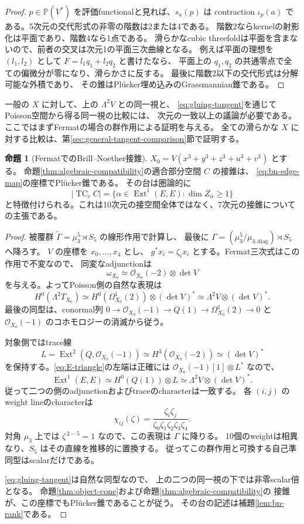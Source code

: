 \documentclass[a4paper,11pt]{ltjsarticle}
\theoremstyle{definition}
\newtheorem{theorem}{命題}[section]
\newcommand{\OO}{\mathcal O}
\newcommand{\PP}{\mathbb P}
\newcommand{\Ext}{\operatorname{Ext}}
\begin{document}
\begin{proof}
$p\in\PP(V^*)$ を評価functionalと見れば、$s_a(p)$ は contraction
$\iota_p(a)$ である。5次元の交代形式の非零の階数は2または4である。
階数2ならkernelの射影化は平面であり、階数4なら1点である。
滑らかなcubic threefoldは平面を含まないので、前者の交叉は次元1の平面三次曲線となる。
例えば平面の理想を $(l_1,l_2)$ として $F=l_1q_1+l_2q_2$ と書けたなら、
平面上の $q_1,q_2$ の共通零点で全ての偏微分が零になり、滑らかさに反する。
最後に階数2以下の交代形式は分解可能な外積であり、
その錐はPl\"ucker埋め込みのGrassmannian錐である。
\end{proof}

一般の $X$ に対して、上の $\Lambda^2V$ との同一視と、
\eqref{eq:gluing-tangent}を通じてPoisson空間から得る同一視の比較には、
次元の一致以上の議論が必要である。
ここではまずFermatの場合の群作用による証明を与える。
全ての滑らかな $X$ に対する比較は、第\ref{sec:general-tangent-comparison}節で証明する。

\begin{theorem}[FermatでのBrill--Noether接錐]\label{thm:fermat-bn-cone}
$X_0=V(x^3+y^3+z^3+u^3+v^3)$ とする。
命題\ref{thm:algebraic-compatibility}の適合部分空間 $C$ の接錐は、
\eqref{eq:bn-edge-map}の座標でPl\"ucker錐である。
その台は圏論的に
\[
 \left|\operatorname{TC}_cC\right|
 =\{\alpha\in\Ext^1(E,E):\dim Z_\alpha\ge1\}
\]
と特徴付けられる。これは10次元の接空間全体ではなく、7次元の接錐についての主張である。
\end{theorem}

\begin{proof}
被覆群
$\widetilde\Gamma=\mu_3^5\rtimes S_5$ の線形作用で計算し、
最後に $\Gamma=(\mu_3^5/\mu_{3,\mathrm{diag}})\rtimes S_5$ へ降ろす。
$V$ の座標を $x_0,\ldots,x_4$ とし、
$g^*x_i=\zeta_i x_i$ とする。Fermat三次式はこの作用で不変なので、
同変なadjunctionは
\[
 \omega_{X_0}\simeq\OO_{X_0}(-2)\otimes\det V
\]
を与える。よってPoisson側の自然な表現は
\[
 H^0(\Lambda^2T_{X_0})
 \simeq H^0(\Omega^1_{X_0}(2))\otimes(\det V)^*
 \simeq\Lambda^2V\otimes(\det V)^*.
\]
最後の同型は、conormal列
$0\to\OO_{X_0}(-1)\to Q(1)\to\Omega^1_{X_0}(2)\to0$
と $\OO_{X_0}(-1)$ のコホモロジーの消滅から従う。

対象側ではtrace線
\[
 L=\Ext^2(Q,\OO_{X_0}(-1))
   \simeq H^3(\OO_{X_0}(-2))
   \simeq(\det V)^*
\]
を保持する。\eqref{eq:E-triangle}の左端は正確には
$\OO_{X_0}(-1)[1]\otimes L^*$ なので、
\[
 \Ext^1(E,E)
 \simeq H^0(Q(1))\otimes L
 \simeq\Lambda^2V\otimes(\det V)^*.
\]
従って二つの側のadjunctionおよびtraceのcharacterは一致する。
各 $(i,j)$ のweight lineのcharacterは
\[
 \chi_{ij}(\zeta)
  =\frac{\zeta_i\zeta_j}{\zeta_0\zeta_1\zeta_2\zeta_3\zeta_4}.
\]
対角 $\mu_3$ 上では $\zeta^{\,2-5}=1$ なので、この表現は $\Gamma$ に降りる。
10個のweightは相異なり、$S_5$ はその直線を推移的に置換する。
従ってこの群作用と可換する自己準同型はscalarだけである。

\eqref{eq:gluing-tangent}は自然な同型なので、
上の二つの同一視の下では非零scalar倍となる。
命題\ref{thm:object-cone}および命題\ref{thm:algebraic-compatibility}の
接錐が、この座標でもPl\"ucker錐であることが従う。
その台の記述は補題\ref{lem:bn-rank}である。
\end{proof}
\end{document}
